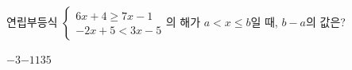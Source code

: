 연립부등식 $\begin{cases} 6x+4\ge 7x-1 \\ -2x+5<3x-5 \end{cases}$의 해가 $a<x\le b$일 때, $b-a$의 값은?
\begin{choices32}{$-3$}{$-1$}{$1$}{$3$}{$5$}\end{choices32}
